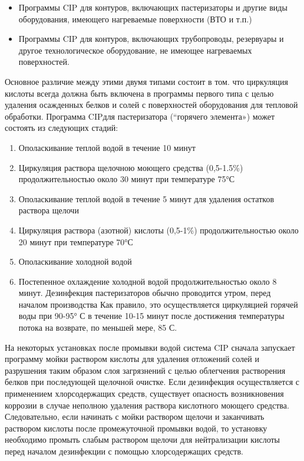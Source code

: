 \documentclass[a4paper,12pt,oneside]{extarticle}
\begin{document}
 \begin{itemize}
 	\item Программы CIP для контуров, включающих пастеризаторы и другие виды оборудования, имеющего нагреваемые поверхности (ВТО и т.п.)
 	\item Программы CIP для контуров, включающих трубопроводы, резервуары и другое технологическое оборудование, не имеющее нагреваемых поверхностей.
 \end{itemize}
 
\begin{flushleft}
	Основное различие между этими двумя типами состоит в том. что циркуляция кислоты всегда должна быть включена в программы первого типа с целью удаления осажденных белков и солей с поверхностей оборудования для тепловой обработки. Программа CIPдля пастеризатора (“горячего элемента») может состоять из следующих стадий:
\end{flushleft}	

\begin{enumerate}
	\item Ополаскивание теплой водой в течение 10 минут
	\item Циркуляция раствора щелочною моющего средства (0,5-1.5\%) продолжительностью около 30 минут при температуре 75°С
	\item Ополаскивание теплой водой в течение 5 минут для удаления остатков раствора щелочи
	\item Циркуляция раствора (азотной) кислоты (0,5-1\%) продолжительностью около 20 минут при температуре 70°С
	\item Ополаскивание холодной водой
	\item  Постепенное охлаждение холодной водой продолжительностью около 8 минут. Дезинфекция пастеризаторов обычно проводится утром, перед началом производства Как правило, это осуществляется циркуляцией горячей воды при 90-95° С в течение 10-15 минут после достижения температуры потока на возврате, по меньшей мере, 85 С.
\end{enumerate}

\begin{flushleft}
		На некоторых установках после промывки водой система CIP сначала запускает программу мойки раствором кислоты для удаления отложений солей и разрушения таким образом слоя загрязнений с целью облегчения растворения белков при последующей щелочной очистке. Если дезинфекция осуществляется с применением хлорсодержащих средств, существует опасность возникновения коррозии в случае неполною удаления раствора кислотного моющего средства. Следовательно, если начинать с мойки раствором щелочи и заканчивать раствором кислоты после промежуточной промывки водой, то установку необходимо промыть слабым раствором щелочи для нейтрализации кислоты перед началом дезинфекции с помощью хлорсодержащих средств.
\end{flushleft}
 
\end{document}

